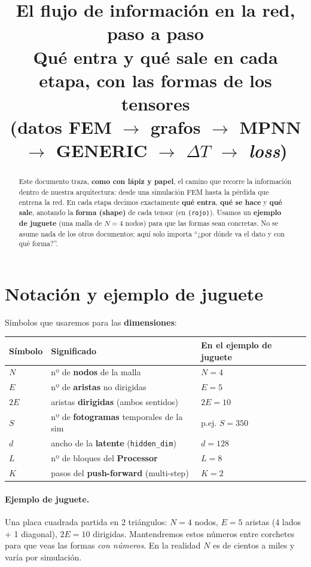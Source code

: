 \documentclass[11pt]{article}
\title{\bfseries El flujo de información en la red, paso a paso\\[3pt]
  \large Qué entra y qué sale en cada etapa, con las formas de los tensores\\
  (datos FEM $\to$ grafos $\to$ MPNN $\to$ GENERIC $\to$ $\Delta T$ $\to$ \emph{loss})}
\author{}
\date{}
\newcommand{\shp}[1]{{\color{shapecol}\texttt{(#1)}}}   %
\theoremstyle{definition}
\begin{document}
\maketitle

\begin{abstract}
\noindent
Este documento traza, \textbf{como con lápiz y papel}, el camino que recorre la
información dentro de nuestra arquitectura: desde una simulación FEM hasta la
pérdida que entrena la red. En cada etapa decimos exactamente \textbf{qué entra},
\textbf{qué se hace} y \textbf{qué sale}, anotando la \textbf{forma (shape)} de cada
tensor (en \shp{rojo}). Usamos un \textbf{ejemplo de juguete} (una malla de
$N{=}4$ nodos) para que las formas sean concretas. No se asume nada de los otros
documentos; aquí solo importa ``¿por dónde va el dato y con qué forma?''.
\end{abstract}

\tableofcontents
\bigskip

\section{Notación y ejemplo de juguete}
\label{sec:notacion}

Símbolos que usaremos para las \textbf{dimensiones}:
\begin{center}\small
\begin{tabular}{@{}lll@{}}
\toprule
Símbolo & Significado & En el ejemplo de juguete \\
\midrule
$N$ & nº de \textbf{nodos} de la malla & $N=4$ \\
$E$ & nº de \textbf{aristas} no dirigidas & $E=5$ \\
$2E$ & aristas \textbf{dirigidas} (ambos sentidos) & $2E=10$ \\
$S$ & nº de \textbf{fotogramas} temporales de la sim & p.ej. $S=350$ \\
$d$ & ancho de la \textbf{latente} (\texttt{hidden\_dim}) & $d=128$ \\
$L$ & nº de bloques del \textbf{Processor} & $L=8$ \\
$K$ & pasos del \textbf{push-forward} (multi-step) & $K=2$ \\
\bottomrule
\end{tabular}
\end{center}

\paragraph{Ejemplo de juguete.} Una placa cuadrada partida en 2 triángulos:
$N{=}4$ nodos, $E{=}5$ aristas (4 lados + 1 diagonal), $2E{=}10$ dirigidas.
Mantendremos estos números entre corchetes para que veas las formas \emph{con
números}. En la realidad $N$ es de cientos a miles y varía por simulación.
\end{document}
